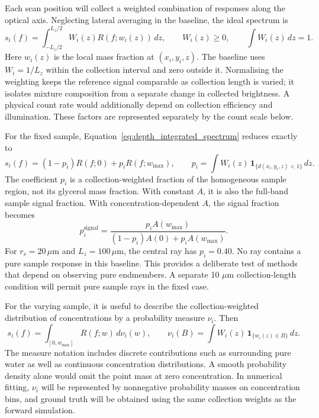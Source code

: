 \documentclass[11pt]{article}
\newcommand{\wmax}{w_{\max}}
\begin{document}
Each scan position will collect a weighted combination of responses along the optical axis. Neglecting lateral averaging in the baseline, the ideal spectrum is
\begin{equation}
 s_i(f)=\int_{-L_z/2}^{L_z/2}W_i(z)R(f;w_i(z))\,dz,
 \qquad W_i(z)\geq0,\qquad \int W_i(z)\,dz=1.
 \label{eq:depth_integrated_spectrum}
\end{equation}
Here $w_i(z)$ is the local mass fraction at $(x_i,y_i,z)$. The baseline uses $W_i=1/L_z$ within the collection interval and zero outside it. Normalising the weighting keeps the reference signal comparable as collection length is varied; it isolates mixture composition from a separate change in collected brightness. A physical count rate would additionally depend on collection efficiency and illumination. These factors are represented separately by the count scale below.

For the fixed sample, Equation~\ref{eq:depth_integrated_spectrum} reduces exactly to
\begin{equation}
 s_i(f)=(1-p_i)R(f;0)+p_iR(f;\wmax),\qquad
 p_i=\int W_i(z)\,\mathbf{1}_{\{d(x_i,y_i,z)<1\}}\,dz.
 \label{eq:fixed_mixture}
\end{equation}
The coefficient $p_i$ is a collection-weighted fraction of the homogeneous sample region, not its glycerol mass fraction. With constant $A$, it is also the full-band sample signal fraction. With concentration-dependent $A$, the signal fraction becomes
\begin{equation}
 p_i^{\mathrm{signal}}=
 \frac{p_i A(\wmax)}{(1-p_i)A(0)+p_i A(\wmax)}.
 \label{eq:signal_fraction}
\end{equation}
For $r_s=20\,\mu\mathrm m$ and $L_z=100\,\mu\mathrm m$, the central ray has $p_i=0.40$. No ray contains a pure sample response in this baseline. This provides a deliberate test of methods that depend on observing pure endmembers. A separate 10 $\mu\mathrm m$ collection-length condition will permit pure sample rays in the fixed case.

For the varying sample, it is useful to describe the collection-weighted distribution of concentrations by a probability measure $\nu_i$. Then
\begin{equation}
 s_i(f)=\int_{[0,\wmax]}R(f;w)\,d\nu_i(w),\qquad
 \nu_i(B)=\int W_i(z)\,\mathbf{1}_{\{w_i(z)\in B\}}\,dz.
 \label{eq:continuous_unmixing}
\end{equation}
The measure notation includes discrete contributions such as surrounding pure water as well as continuous concentration distributions. A smooth probability density alone would omit the point mass at zero concentration. In numerical fitting, $\nu_i$ will be represented by nonnegative probability masses on concentration bins, and ground truth will be obtained using the same collection weights as the forward simulation.
\end{document}
